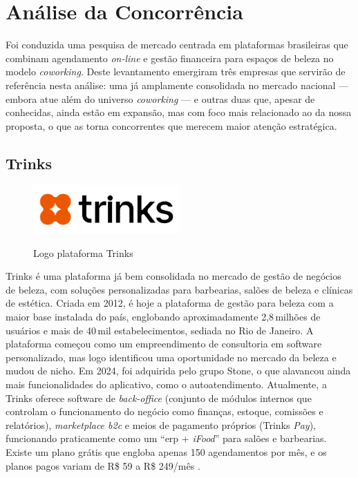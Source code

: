 \section{Análise da Concorrência}
\label{sec:analise-concorrencia}
Foi conduzida uma pesquisa de mercado centrada em plataformas brasileiras que combinam agendamento \emph{on-line} e gestão financeira para espaços de beleza no modelo \emph{coworking}. Deste levantamento emergiram três empresas que servirão de referência nesta análise: uma já amplamente consolidada no mercado nacional — embora atue além do universo \emph{coworking} — e outras duas que, apesar de conhecidas, ainda estão em expansão, mas com foco mais relacionado ao da nossa proposta, o que as torna concorrentes que merecem maior atenção estratégica.

\subsection{Trinks}

\begin{figure}[htb]
	\centering
	\caption{Logo plataforma Trinks}
	\includegraphics[width=0.5\textwidth]{cap01-Introducao/Images/1.4.1_Trinks}
	\label{fig:Trinks}
\end{figure}

 \FloatBarrier

Trinks é uma plataforma já bem consolidada no mercado de gestão de negócios de beleza, com soluções
personalizadas para barbearias, salões de beleza e clínicas de estética. Criada em 2012, é hoje a
plataforma de gestão para beleza com a maior base instalada do país, englobando aproximadamente
2,8\,milhões de usuários e mais de 40\,mil estabelecimentos, sediada no Rio de Janeiro. A plataforma começou como um empreendimento de consultoria em software personalizado, mas logo identificou uma oportunidade no mercado da beleza e mudou de nicho. Em 2024, foi adquirida pelo grupo Stone, o que alavancou ainda mais funcionalidades do aplicativo, como o autoatendimento.
Atualmente, a Trinks oferece software de \emph{back-office} (conjunto de módulos internos que controlam o funcionamento do negócio como finanças, estoque, comissões e relatórios), \emph{marketplace \gls{b2c}} e meios de pagamento próprios (Trinks \emph{Pay}), funcionando praticamente como um “\gls{erp} + \emph{iFood}” para salões e barbearias. Existe um
plano grátis que engloba apenas 150 agendamentos por mês, e os planos pagos variam de R\$ 59 a R\$ 249/mês \cite{Trinks}.

